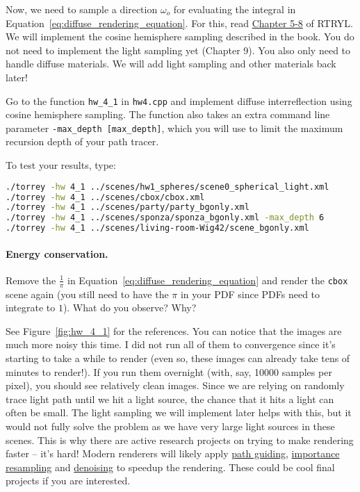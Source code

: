 Now, we need to sample a direction $\omega_o$ for evaluating the integral in Equation~\eqref{eq:diffuse_rendering_equation}. For this, read \href{https://raytracing.github.io/books/RayTracingTheRestOfYourLife.html#lightscattering}{Chapter 5-8} of RTRYL. We will implement the cosine hemisphere sampling described in the book. You do not need to implement the light sampling yet (Chapter 9). You also only need to handle diffuse materials. We will add light sampling and other materials back later!

Go to the function \lstinline{hw_4_1} in \lstinline{hw4.cpp} and implement diffuse interreflection using cosine hemisphere sampling. The function also takes an extra command line parameter \lstinline{-max_depth [max_depth]}, which you will use to limit the maximum recursion depth of your path tracer. 

To test your results, type:
\begin{lstlisting}[language=bash]
./torrey -hw 4_1 ../scenes/hw1_spheres/scene0_spherical_light.xml
./torrey -hw 4_1 ../scenes/cbox/cbox.xml
./torrey -hw 4_1 ../scenes/party/party_bgonly.xml
./torrey -hw 4_1 ../scenes/sponza/sponza_bgonly.xml -max_depth 6
./torrey -hw 4_1 ../scenes/living-room-Wig42/scene_bgonly.xml
\end{lstlisting}

\paragraph{Energy conservation.} Remove the $\frac{1}{\pi}$ in Equation~\eqref{eq:diffuse_rendering_equation} and render the \lstinline{cbox} scene again (you still need to have the $\pi$ in your PDF since PDFs need to integrate to $1$). What do you observe? Why?

See Figure~\ref{fig:hw_4_1} for the references. You can notice that the images are much more noisy this time. I did not run all of them to convergence since it's starting to take a while to render (even so, these images can already take tens of minutes to render!). If you run them overnight (with, say, 10000 samples per pixel), you should see relatively clean images. Since we are relying on randomly trace light path until we hit a light source, the chance that it hits a light can often be small. The light sampling we will implement later helps with this, but it would not fully solve the problem as we have very large light sources in these scenes. This is why there are active research projects on trying to make rendering faster -- it's hard! Modern renderers will likely apply \href{https://cgg.mff.cuni.cz/~jirka/path-guiding-in-production/2019/index.htm}{path guiding}, \href{https://cs.dartmouth.edu/~wjarosz/publications/bitterli20spatiotemporal.html}{importance resampling} and \href{https://www.cmlab.csie.ntu.edu.tw/project/sbf/}{denoising} to speedup the rendering. These could be cool final projects if you are interested.

